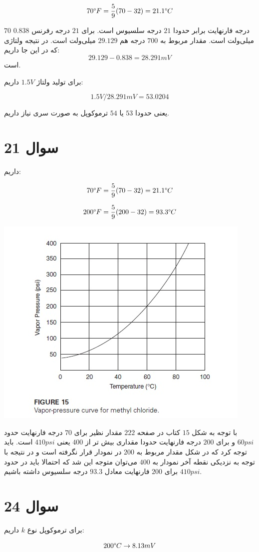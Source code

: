 \documentclass[12pt]{article}
\begin{document}
$$70 \degree F = \frac{5}{9} (70 -32) = 21.1 \degree C$$

$70$ درجه فارنهایت برابر حدودا $21$ درجه سلسیوس است. برای $21$ درجه رفرنس $0.838$ میلی‌ولت است.  مقدار مربوط به $700$ درجه هم $29.129$ میلی‌ولت است. در نتیجه ولتاژی که در این جا داریم:
$$29.129 - 0.838 = 28.291 mV$$
است.

برای تولید ولتاژ $1.5V$ داریم:

$$1.5V / 28.291 mV = 53.0204 $$

یعنی حدودا $53$ یا $54$ ترموکوپل به صورت سری نیاز داریم.

\newpage
\section*{سوال 21}


داریم:

$$70 \degree F = \frac{5}{9} (70 -32) = 21.1 \degree C$$


$$200 \degree F = \frac{5}{9} (200 -32) = 93.3 \degree C$$

\begin{center}
	\includegraphics[width = 0.5 \textwidth]{images/5.jpg}
\end{center}

با توجه به شکل $15$ کتاب در صفحه $222$ مقدار نظیر برای $70$ درجه فارنهایت حدود $60psi$ و برای $200$ درجه فارنهایت حدودا مقداری بیش تر از $400$ یعنی $410 psi$ است. باید توجه کرد که در شکل مقدار مربوط به $200$ در نمودار قرار نگرفته است و در نتیجه با توجه به نزدیکی نقطه آخر نمودار به $400$ می‌توان متوجه این شد که احتمالا باید در حدود $410psi$ برای $200$ فارنهایت معادل $93.3$ درجه سلسیوس داشته باشیم.


\newpage
\section*{سوال 24}


برای ترموکوپل نوع $k$ داریم:

$$200 \degree C \rightarrow 8.13 mV$$
\end{document}
